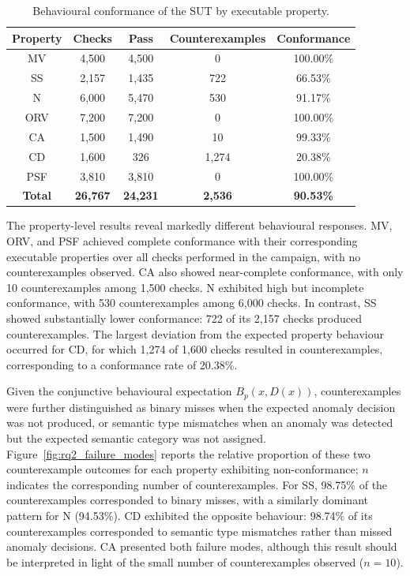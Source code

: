 \documentclass[preprint,12pt]{elsarticle}
\begin{document}
\begin{table}[!t]
\centering
\caption{Behavioural conformance of the SUT by executable property.}
\label{tab:rq2_conformance}
\scriptsize
\setlength{\tabcolsep}{4pt}
\renewcommand{\arraystretch}{1.15}
\begin{tabular}{|c|c|c|c|c|}
\hline
\textbf{Property} &
\textbf{Checks} &
\textbf{Pass} &
\textbf{Counterexamples} &
\textbf{Conformance} \\
\hline
MV  & 4,500 & 4,500 & 0     & 100.00\% \\
SS  & 2,157 & 1,435 & 722   & 66.53\% \\
N   & 6,000 & 5,470 & 530   & 91.17\% \\
ORV & 7,200 & 7,200 & 0     & 100.00\% \\
CA  & 1,500 & 1,490 & 10    & 99.33\% \\
CD  & 1,600 & 326   & 1,274 & 20.38\% \\
PSF & 3,810 & 3,810 & 0     & 100.00\% \\
\hline
\textbf{Total} &
\textbf{26,767} &
\textbf{24,231} &
\textbf{2,536} &
\textbf{90.53\%} \\
\hline
\end{tabular}
\end{table}

The property-level results reveal markedly different behavioural responses. MV, ORV, and PSF achieved complete conformance with their corresponding executable properties over all checks performed in the campaign, with no counterexamples observed. CA also showed near-complete conformance,
with only 10 counterexamples among 1,500 checks. N exhibited high but
incomplete conformance, with 530 counterexamples among 6,000 checks. In
contrast, SS showed substantially lower conformance: 722 of its 2,157 checks
produced counterexamples. The largest deviation from the expected property
behaviour occurred for CD, for which 1,274 of 1,600 checks resulted in
counterexamples, corresponding to a conformance rate of 20.38\%.

Given the conjunctive behavioural expectation \(B_p(x,D(x))\),
counterexamples were further distinguished as binary misses when the expected
anomaly decision was not produced, or semantic type mismatches when an
anomaly was detected but the expected semantic category was not assigned.
Figure~\ref{fig:rq2_failure_modes} reports the relative proportion of 
these two counterexample outcomes for each property exhibiting non-conformance; \(n\)
indicates the corresponding number of counterexamples. For SS, 98.75\% of
the counterexamples corresponded to binary misses, with a similarly dominant
pattern for N (94.53\%). CD exhibited the opposite behaviour: 98.74\% of its
counterexamples corresponded to semantic type mismatches rather than missed
anomaly decisions. CA presented both failure modes, although this result
should be interpreted in light of the small number of counterexamples
observed (\(n=10\)).
\end{document}
